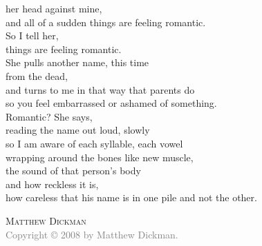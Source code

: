 \documentclass{memoir}
\begin{document}
her head against mine,\\
and all of a sudden things are feeling romantic.\\
So I tell her,\\
things are feeling romantic.\\
She pulls another name, this time\\
from the dead,\\
and turns to me in that way that parents do\\
so you feel embarrassed or ashamed of something.\\
Romantic? She says,\\
reading the name out loud, slowly\\
so I am aware of each syllable, each vowel\\
wrapping around the bones like new muscle,\\
the sound of that person's body\\
and how reckless it is,\\
how careless that his name is in one pile and not the other.

\vspace{11pt}
\hspace{80pt} \textsc{Matthew Dickman}\\
\vfill
\noindent\footnotesize{
\textcolor{gray}{Copyright © 2008 by Matthew Dickman.}} 
\end{document}
